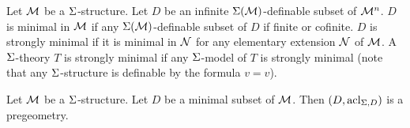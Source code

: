 \begin{dfn}
    Let $\mathcal{M}$ be a $\Sigma$-structure.
    Let $D$ be an infinite $\Sigma(\mathcal{M})$-definable subset of $\mathcal{M}^n$.
    $D$ is minimal in $\mathcal{M}$ if any $\Sigma(\mathcal{M})$-definable subset of $D$
    if finite or cofinite.
    $D$ is strongly minimal if it is minimal in 
    $\mathcal{N}$ for any elementary extension $\mathcal{N}$ of $\mathcal{M}$.
    A $\Sigma$-theory $T$ is strongly minimal if any $\Sigma$-model of $T$
    is strongly minimal 
    (note that any $\Sigma$-structure is definable by the formula $v = v$).
\end{dfn}

\begin{prop}
    Let $\mathcal{M}$ be a $\Sigma$-structure. 
    Let $D$ be a minimal subset of $\mathcal{M}$.
    Then $(D,\operatorname{acl}_{\Sigma,D})$ is a pregeometry.
\end{prop}

